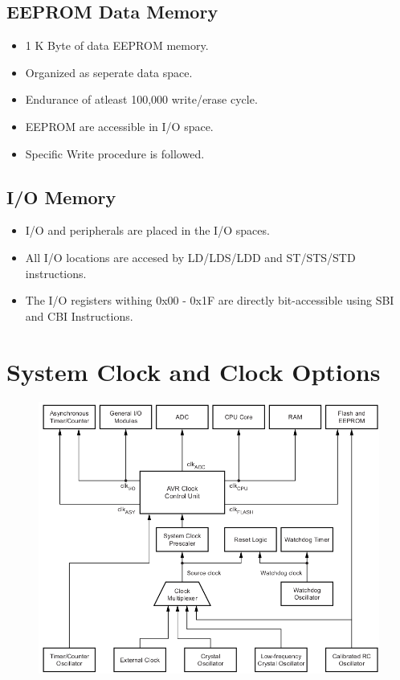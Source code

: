 \documentclass{article}
\begin{document}
\subsection{EEPROM Data Memory}
\begin{itemize}
    \item 1 K Byte of data EEPROM memory.
    \item Organized as seperate data space.
    \item Endurance of atleast 100,000 write/erase cycle.
    \item EEPROM are accessible in I/O space.
    \item Specific Write procedure is followed. 
\end{itemize}

\subsection{I/O Memory}
\begin{itemize}
    \item I/O and peripherals are placed in the I/O spaces.
    \item All I/O locations are accesed by LD/LDS/LDD and ST/STS/STD instructions.
    \item The I/O registers withing 0x00 - 0x1F are directly bit-accessible using SBI and CBI Instructions.
\end{itemize}


\section{System Clock and Clock Options}
\begin{figure}[H]
    \begin{center}
        \includegraphics[height=0.5\textheight]{clkDistribution.png}
    \end{center}
\end{figure}
\end{document}

